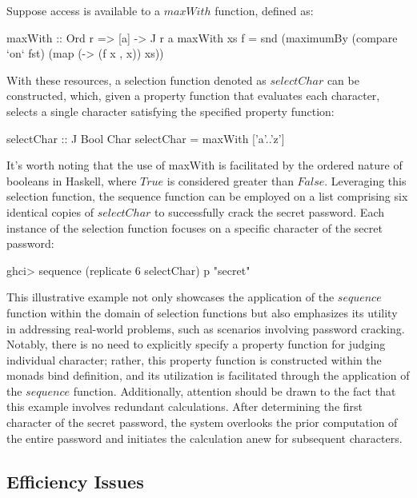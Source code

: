 \documentclass[runningheads]{llncs}
\begin{document}
Suppose access is available to a \(maxWith\) function, defined as:

\begin{code}
maxWith :: Ord r => [a] -> J r a
maxWith xs f = snd (maximumBy (compare `on` fst) 
                              (map (\x -> (f x , x)) xs))
\end{code}

With these resources, a selection function denoted as \(selectChar\) can
be constructed, which, given a property function that evaluates each
character, selects a single character satisfying the specified property
function:

\begin{code}
selectChar :: J Bool Char
selectChar = maxWith ['a'..'z']
\end{code}

It's worth noting that the use of maxWith is facilitated by the ordered
nature of booleans in Haskell, where \(True\) is considered greater than
\(False\). Leveraging this selection function, the sequence function can
be employed on a list comprising six identical copies of \(selectChar\)
to successfully crack the secret password. Each instance of the
selection function focuses on a specific character of the secret
password:

\begin{haskell}
ghci> sequence (replicate 6 selectChar) p
"secret"
\end{haskell}

This illustrative example not only showcases the application of the
\(sequence\) function within the domain of selection functions but also
emphasizes its utility in addressing real-world problems, such as
scenarios involving password cracking. Notably, there is no need to
explicitly specify a property function for judging individual character;
rather, this property function is constructed within the monads bind
definition, and its utilization is facilitated through the application
of the \(sequence\) function. Additionally, attention should be drawn to
the fact that this example involves redundant calculations. After
determining the first character of the secret password, the system
overlooks the prior computation of the entire password and initiates the
calculation anew for subsequent characters.

\subsection{Efficiency Issues}\label{efficiency-issues}
\end{document}
